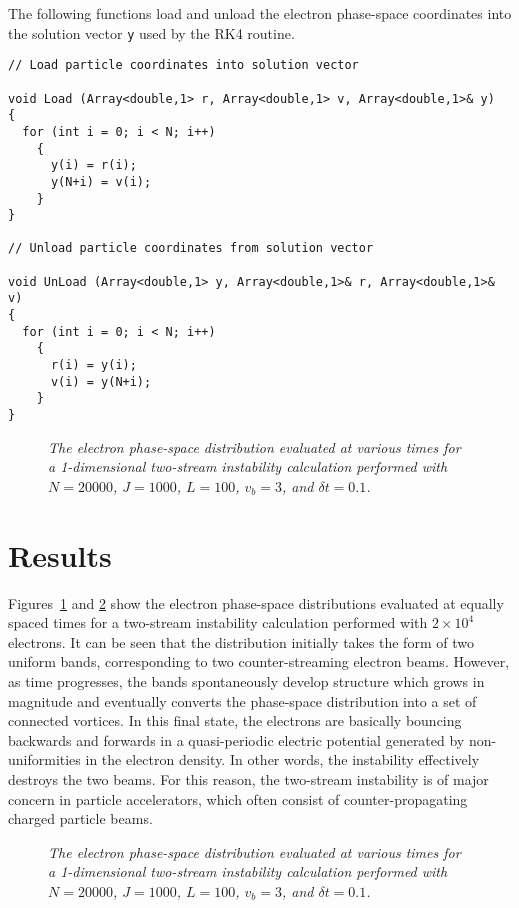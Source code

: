 The following functions load and unload the electron phase-space
coordinates into the solution vector \verb!y! used by the RK4 routine.
\begin{verbatim}
// Load particle coordinates into solution vector

void Load (Array<double,1> r, Array<double,1> v, Array<double,1>& y)
{
  for (int i = 0; i < N; i++)
    {
      y(i) = r(i);
      y(N+i) = v(i);
    }
}

// Unload particle coordinates from solution vector

void UnLoad (Array<double,1> y, Array<double,1>& r, Array<double,1>& v)
{
  for (int i = 0; i < N; i++)
    {
      r(i) = y(i);
      v(i) = y(N+i);
    }
}
\end{verbatim}

\begin{figure}
\epsfysize=3.5in
\centerline{}
\caption{\em The electron phase-space distribution evaluated
at various times for a 1-dimensional two-stream instability calculation performed with $N=20000$, $J=1000$, $L=100$, $v_b = 3$, and $\delta t =0.1$.}\label{pic1}
\end{figure}

\section{Results}
Figures~\ref{pic1} and \ref{pic2} show the electron phase-space distributions
evaluated at equally spaced times for a two-stream instability calculation
performed with $2\times 10^4$ electrons. It can be seen that the distribution
initially takes the form of two uniform bands, corresponding to two
counter-streaming electron beams. However, as time progresses, the
bands spontaneously develop structure which grows in magnitude and
eventually converts the phase-space distribution into a set of connected
vortices. In this final state, the electrons are basically bouncing backwards
and forwards in  a quasi-periodic electric potential generated by non-uniformities
in the electron density. In other words,  the instability effectively destroys the two
beams. For this reason, the two-stream instability is of major
concern in particle accelerators, which often consist of counter-propagating
charged particle beams.

\begin{figure}
\epsfysize=3.5in
\centerline{}
\caption{\em The electron phase-space distribution evaluated
at various times for a 1-dimensional two-stream instability calculation performed with $N=20000$, $J=1000$, $L=100$, $v_b = 3$, and $\delta t =0.1$.}\label{pic2}
\end{figure}

